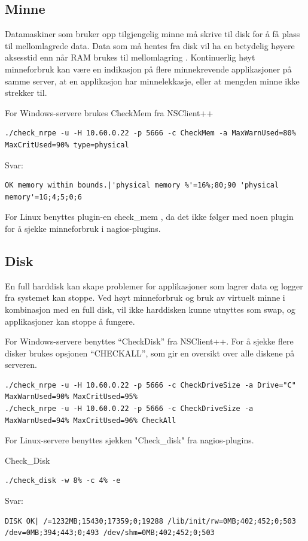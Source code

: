\subsection{Minne}
Datamaskiner som bruker opp tilgjengelig minne må skrive til disk for å få plass til mellomlagrede data. Data som må hentes fra disk vil ha en betydelig høyere aksesstid enn når RAM brukes til mellomlagring \cite{wiki:mem}. 
Kontinuerlig høyt minneforbruk kan være en indikasjon på flere minnekrevende applikasjoner på samme server, at en applikasjon har minnelekkasje, eller at mengden minne ikke strekker til.

For Windows-servere brukes CheckMem fra NSClient++
\begin{lstlisting}[style=example]
./check_nrpe -u -H 10.60.0.22 -p 5666 -c CheckMem -a MaxWarnUsed=80% MaxCritUsed=90% type=physical
\end{lstlisting}
Svar:
\begin{lstlisting}[style=example]
OK memory within bounds.|'physical memory %'=16%;80;90 'physical memory'=1G;4;5;0;6
\end{lstlisting}

For Linux benyttes plugin-en check\_mem \cite{checklinuxmem}, da det ikke følger med noen plugin for å sjekke minneforbruk i nagios-plugins.

\subsection{Disk}
En full harddisk kan skape problemer for applikasjoner som lagrer data og logger fra systemet kan stoppe. Ved høyt minneforbruk og bruk av virtuelt minne i kombinasjon med en full disk, vil ikke harddisken kunne utnyttes som swap, og applikasjoner kan stoppe å fungere.

For Windows-servere benyttes ``CheckDisk'' fra NSClient++. For å sjekke flere disker brukes opsjonen ``CHECKALL'', som gir en oversikt over alle diskene på serveren.

\begin{lstlisting}[style=example]
./check_nrpe -u -H 10.60.0.22 -p 5666 -c CheckDriveSize -a Drive="C" MaxWarnUsed=90% MaxCritUsed=95%
./check_nrpe -u -H 10.60.0.22 -p 5666 -c CheckDriveSize -a MaxWarnUsed=94% MaxCritUsed=96% CheckAll
\end{lstlisting}

For Linux-servere benyttes sjekken "Check\_disk" fra nagios-plugins.

Check\_Disk
\begin{lstlisting}[style=example]
./check_disk -w 8% -c 4% -e
\end{lstlisting}
Svar: 
\begin{lstlisting}[style=example]
DISK OK| /=1232MB;15430;17359;0;19288 /lib/init/rw=0MB;402;452;0;503 /dev=0MB;394;443;0;493 /dev/shm=0MB;402;452;0;503
\end{lstlisting}

